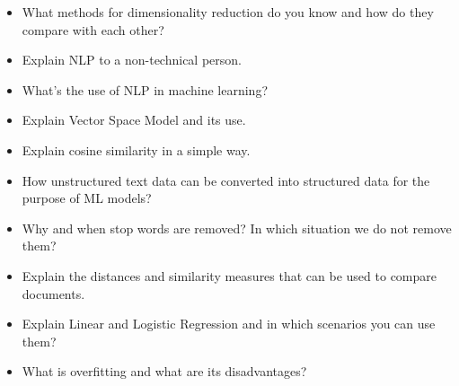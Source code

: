 \documentclass{article}
\begin{document}
\begin{itemize}
	\item What methods for dimensionality reduction do you know and how do they compare with each other?
	\item Explain NLP to a non-technical person.
	\item What's the use of NLP in machine learning?
	\item Explain Vector Space Model and its use.
	\item Explain cosine similarity in a simple way.
	\item How unstructured text data can be converted into structured data for the purpose of ML models?
	\item Why and when stop words are removed? In which situation we do not remove them?
	\item Explain the distances and similarity measures that can be used to compare documents.
	\item Explain Linear and Logistic Regression and in which scenarios you can use them?
	\item What is overfitting and what are its disadvantages?
\end{itemize}
\end{document}
